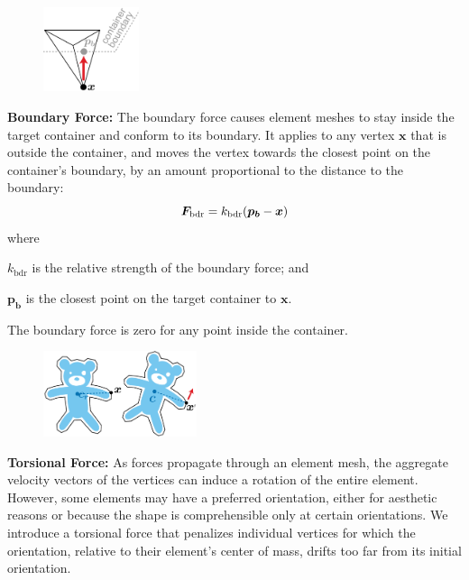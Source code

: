 \begin{figure}
\vspace{-15pt}
\centering
    \includegraphics[width=0.25\textwidth]{figures/repulsionpak/boundary_forces.pdf}
\end{figure}
\textbf{Boundary Force:}
The boundary force causes element meshes to stay inside the target container
and conform to its boundary. It applies to any vertex $\bm{x}$ that
is outside the container, and moves the vertex towards the closest point
on the container's boundary, by an amount proportional to the distance to
the boundary:
\begin{equation}
\bm{F}_\mathrm{bdr} = k_\mathrm{bdr} (\bm{p_b} - \bm{x})
\end{equation}
where
\begin{packeddescriptions}
	\item[$k_\mathrm{bdr}$] is the relative strength of the boundary force; and
	\item[$\bm{p_b}$] is the closest point on the target container to $\bm{x}$.
\end{packeddescriptions}

The boundary force is zero for any point inside the container.

\bigskip

\begin{figure}
\vspace{-15pt}
\centering
    \includegraphics[width=0.4\textwidth]{figures/repulsionpak/torsional_forces.pdf}
\end{figure}
\textbf{Torsional Force:} 
As forces propagate through an element mesh, the aggregate velocity
vectors of the vertices can induce a rotation of the entire element.
However, some elements may have a preferred orientation,
either for aesthetic reasons or because the shape is comprehensible only at certain orientations.
We introduce a torsional force that
penalizes individual vertices for which the orientation, relative to their
element's center of mass, drifts too far from its initial orientation.

